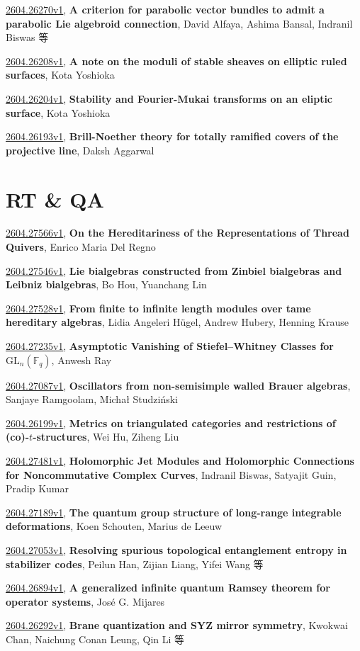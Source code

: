 \documentclass[9pt, a4paper]{article}
\theoremstyle{plain}
\theoremstyle{definition}
\theoremstyle{remark}
\newcommand{\arxiv}[3]{\href{https://arxiv.org/abs/#1}{#1}, \textbf{\textcolor{arxivblue}{#2}}, #3}
\begin{document}
\arxiv{2604.26270v1}{A criterion for parabolic vector bundles to admit a parabolic Lie algebroid connection}{David Alfaya, Ashima Bansal, Indranil Biswas 等}

\arxiv{2604.26208v1}{A note on the moduli of stable sheaves on elliptic ruled surfaces}{Kota Yoshioka}

\arxiv{2604.26204v1}{Stability and Fourier-Mukai transforms on an eliptic surface}{Kota Yoshioka}

\arxiv{2604.26193v1}{Brill-Noether theory for totally ramified covers of the projective line}{Daksh Aggarwal}


\section{RT \& QA}
\arxiv{2604.27566v1}{On the Hereditariness of the Representations of Thread Quivers}{Enrico Maria Del Regno}

\arxiv{2604.27546v1}{Lie bialgebras constructed from Zinbiel bialgebras and Leibniz bialgebras}{Bo Hou, Yuanchang Lin}

\arxiv{2604.27528v1}{From finite to infinite length modules over tame hereditary algebras}{Lidia Angeleri Hügel, Andrew Hubery, Henning Krause}

\arxiv{2604.27235v1}{Asymptotic Vanishing of Stiefel--Whitney Classes for $\mathrm{GL}_n(\mathbb{F}_q)$}{Anwesh Ray}

\arxiv{2604.27087v1}{Oscillators from non-semisimple walled Brauer algebras}{Sanjaye Ramgoolam, Michał Studziński}

\arxiv{2604.26199v1}{Metrics on triangulated categories and restrictions of (co)-$t$-structures}{Wei Hu, Ziheng Liu}

\arxiv{2604.27481v1}{Holomorphic Jet Modules and Holomorphic Connections for Noncommutative Complex Curves}{Indranil Biswas, Satyajit Guin, Pradip Kumar}

\arxiv{2604.27189v1}{The quantum group structure of long-range integrable deformations}{Koen Schouten, Marius de Leeuw}

\arxiv{2604.27053v1}{Resolving spurious topological entanglement entropy in stabilizer codes}{Peilun Han, Zijian Liang, Yifei Wang 等}

\arxiv{2604.26894v1}{A generalized infinite quantum Ramsey theorem for operator systems}{José G. Mijares}

\arxiv{2604.26292v1}{Brane quantization and SYZ mirror symmetry}{Kwokwai Chan, Naichung Conan Leung, Qin Li 等}

\end{document}

